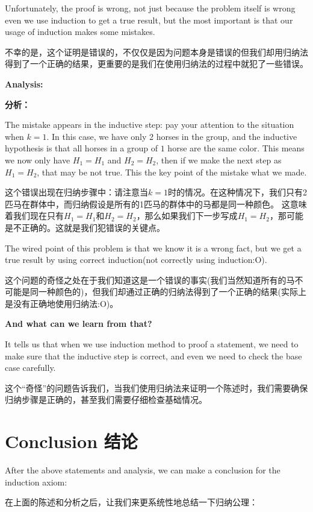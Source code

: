 \documentclass{Math_Note}
\begin{document}
Unfortunately, the proof is wrong, not just because the problem itself is wrong even we use induction to get a true result, but the most important is that our usage of induction makes some mistakes.

不幸的是，这个证明是错误的，不仅仅是因为问题本身是错误的但我们却用归纳法得到了一个正确的结果，更重要的是我们在使用归纳法的过程中就犯了一些错误。

\textbf{Analysis:}

\textbf{分析：}

The mistake appears in the inductive step: pay your attention to the situation when $k=1$. In this case, we have only 2 horses in the group, and the inductive hypothesis is that all horses in a group of $1$ horse are the same color. 
This means we now only have $H_{1}=H_{1}$ and $H_{2}=H_{2}$, then if we make the next step as $H_{1}=H_{2}$, that may be not true. This the key point of the mistake what we made.

这个错误出现在归纳步骤中：请注意当$k=1$时的情况。在这种情况下，我们只有2匹马在群体中，而归纳假设是所有的1匹马的群体中的马都是同一种颜色。
这意味着我们现在只有$H_{1}=H_{1}$和$H_{2}=H_{2}$，那么如果我们下一步写成$H_{1}=H_{2}$，那可能是不正确的。这就是我们犯错误的关键点。

The wired point of this problem is that we know it is a wrong fact, but we get a true result by using correct induction(not correctly using induction:O).

这个问题的奇怪之处在于我们知道这是一个错误的事实(我们当然知道所有的马不可能是同一种颜色的)，但我们却通过正确的归纳法得到了一个正确的结果(实际上是没有正确地使用归纳法:O)。

\textbf{And what can we learn from that?} 

It tells us that when we use induction method to proof a statement, we need to make sure that the inductive step is correct, and even we need to check the base case carefully.

这个“奇怪”的问题告诉我们，当我们使用归纳法来证明一个陈述时，我们需要确保归纳步骤是正确的，甚至我们需要仔细检查基础情况。

\section{Conclusion 结论}

After the above statements and analysis, we can make a conclusion for the induction axiom:

在上面的陈述和分析之后，让我们来更系统性地总结一下归纳公理：
\end{document}
